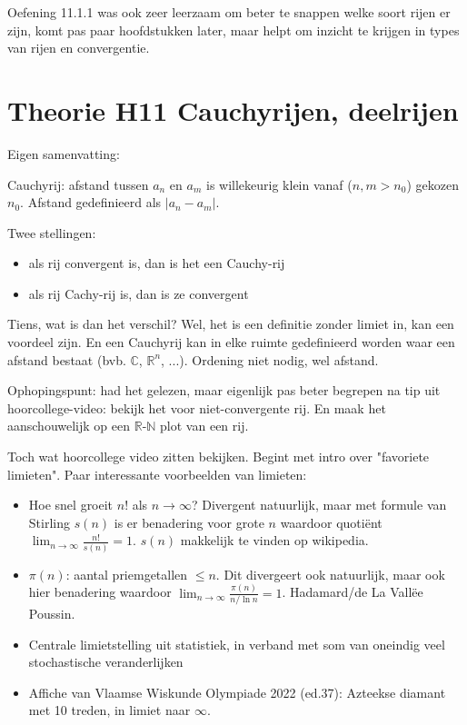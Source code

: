 \documentclass{article}
\begin{document}
Oefening 11.1.1 was ook zeer leerzaam om beter te snappen welke soort rijen er zijn, komt pas paar hoofdstukken later, maar helpt om inzicht te krijgen in types van rijen en convergentie. 

\section{Theorie H11 Cauchyrijen, deelrijen}

Eigen samenvatting: 

Cauchyrij: afstand tussen $a_n$ en $a_m$ is willekeurig klein vanaf ($n,m>n_0$) gekozen $n_0$. Afstand gedefinieerd als $| a_n-a_m|$. 

Twee stellingen: 
\begin{itemize}
    \item als rij convergent is, dan is het een Cauchy-rij
    \item als rij Cachy-rij is, dan is ze convergent 
\end{itemize}

Tiens, wat is dan het verschil? Wel, het is een definitie zonder limiet in, kan een voordeel zijn. En een Cauchyrij kan in elke ruimte gedefinieerd worden waar een afstand bestaat (bvb. $\mathbb{C}$, $\mathbb{R}^n$, ...). Ordening niet nodig, wel afstand. 

Ophopingspunt: had het gelezen, maar eigenlijk pas beter begrepen na tip uit hoorcollege-video: bekijk het voor niet-convergente rij. En maak het aanschouwelijk op een $\mathbb{R}$-$\mathbb{N}$ plot van een rij. 

Toch wat hoorcollege video zitten bekijken. 
Begint met intro over "favoriete limieten". Paar interessante voorbeelden van limieten: 
\begin{itemize}
    \item Hoe snel groeit $n!$ als $n \to \infty$? Divergent natuurlijk, maar met formule van Stirling $s(n)$ is er benadering voor grote $n$ waardoor quoti\"ent $\lim_{n \to \infty} \frac{n!}{s(n)} = 1$. $s(n)$ makkelijk te vinden op wikipedia. 
    \item $\pi(n)$: aantal priemgetallen $\leq n$. Dit divergeert ook natuurlijk, maar ook hier benadering waardoor $\lim_{n \to \infty} \frac{\pi(n)}{n/\ln n} = 1 $. Hadamard/de La Vall\"ee Poussin. 
    \item Centrale limietstelling uit statistiek, in verband met som van oneindig veel stochastische veranderlijken
    \item Affiche van Vlaamse Wiskunde Olympiade 2022 (ed.37): Azteekse diamant met 10 treden, in limiet naar $\infty$. 
\end{itemize}
\end{document}
